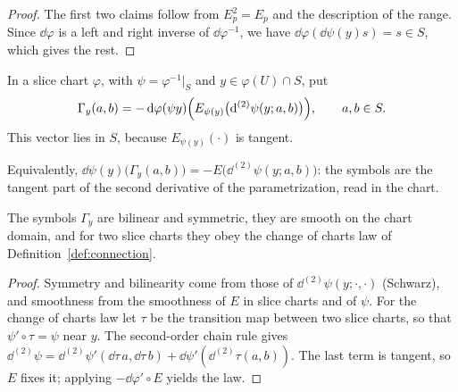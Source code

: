 \begin{proof}
  \leanok
  The first two claims follow from $E_p^2 = E_p$ and the description of the range. Since
  $\dd\varphi$ is a left and right inverse of $\dd\varphi^{-1}$, we have
  $\dd\varphi(\dd\psi(y) s) = s \in S$, which gives the rest.
\end{proof}

\begin{definition}
  \label{def:projector-symbols}
  \leanok
  In a slice chart $\varphi$, with $\psi = \varphi^{-1}|_S$ and $y \in \varphi(U) \cap S$, put
  \[
    \Gamma_y(a, b) = -\,\mathrm{d}\varphi(\psi y)\Bigl(E_{\psi(y)}\bigl(\mathrm{d}^{(2)}\psi(y; a, b)\bigr)\Bigr),
    \qquad a, b \in S .
  \]
  This vector lies in $S$, because $E_{\psi(y)}(\cdot)$ is tangent.
\end{definition}

Equivalently, $\dd\psi(y)\bigl(\Gamma_y(a, b)\bigr) = -E\bigl(\dd^{(2)}\psi(y; a, b)\bigr)$: the
symbols are the tangent part of the second derivative of the parametrization, read in the chart.

\begin{lemma}
  \label{lem:projector-symbols}
  \leanok
  The symbols $\Gamma_y$ are bilinear and symmetric, they are smooth on the chart domain, and for
  two slice charts they obey the change of charts law of Definition~\ref{def:connection}.
\end{lemma}

\begin{proof}
  \leanok
  Symmetry and bilinearity come from those of $\dd^{(2)}\psi(y; \cdot, \cdot)$ (Schwarz), and
  smoothness from the smoothness of $E$ in slice charts and of $\psi$. For the change of charts
  law let $\tau$ be the transition map between two slice charts, so that $\psi' \circ \tau = \psi$
  near $y$. The second-order chain rule gives
  $\dd^{(2)}\psi = \dd^{(2)}\psi'(\dd\tau\, a, \dd\tau\, b) + \dd\psi'(\dd^{(2)}\tau(a, b))$. The
  last term is tangent, so $E$ fixes it; applying $-\dd\varphi' \circ E$ yields the law.
\end{proof}

